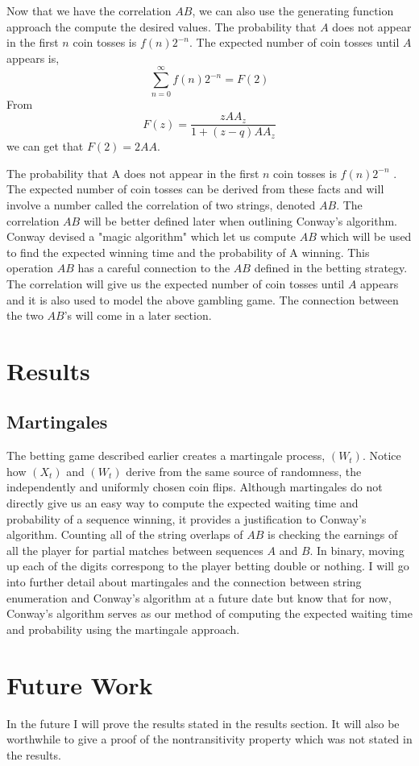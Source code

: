 \documentclass{article}
\numberwithin{mytheorem}{subsection} %
\begin{document}
		Now that we have the correlation $AB$, we can also use the generating function approach the compute the desired values. The probability that $A$ does not appear in the first $n$ coin tosses is $f(n)2^{-n}$. The expected number of coin tosses until $A$ appears is,
		$$\sum_{n=0}^\infty f(n) 2^{-n} = F(2)$$
		From 
		$$F(z) = \frac{zAA_z}{1+(z-q)AA_z}$$
		we can get that $F(2) = 2AA$. \cite{enumerate} \cite{gardner}

		The probability that A does not appear in the first $n$ coin tosses is $f(n)2^{-n}$ \cite{enumerate}. The expected number of coin tosses can be derived from these facts and will involve a number called the correlation of two strings, denoted $AB$. The correlation $AB$ will be better defined later when outlining Conway's algorithm. Conway devised a "magic algorithm" which let us compute $AB$ which will be used to find the expected winning time and the probability of A winning. This operation $AB$ has a careful connection to the $AB$ defined in the betting strategy. The correlation will give us the expected number of coin tosses until $A$ appears and it is also used to model the above gambling game. The connection between the two $AB$'s will come in a later section.

	\section{Results}
		\subsection{Martingales}
			The betting game described earlier creates a martingale process, $(W_t)$. Notice how $(X_t)$ and $(W_t)$ derive from the same source of randomness, the independently and uniformly chosen coin flips. Although martingales do not directly give us an easy way to compute the expected waiting time and probability of a sequence winning, it provides a justification to Conway's algorithm. Counting all of the string overlaps of $AB$ is checking the earnings of all the player for partial matches between sequences $A$ and $B$. In binary, moving up each of the digits correspong to the player betting double or nothing. I will go into further detail about martingales and the connection between string enumeration and Conway's algorithm at a future date but know that for now, Conway's algorithm serves as our method of computing the expected waiting time and probability using the martingale approach.


	\section{Future Work}
		In the future I will prove the results stated in the results section. It will also be worthwhile to give a proof of the nontransitivity property which was not stated in the results.
\end{document}
